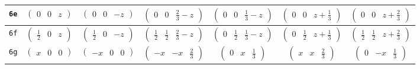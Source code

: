 \documentclass[fleqn,9pt,landscape]{jsarticle}
\begin{document}
\begin{center}
\begin{longtable}{ccccccc}
{\tt 6e} & $ \begin{pmatrix} 0 & 0 & z \end{pmatrix} $ & $ \begin{pmatrix} 0 & 0 & - z \end{pmatrix} $ & $ \begin{pmatrix} 0 & 0 & \frac{2}{3} - z \end{pmatrix} $ & $ \begin{pmatrix} 0 & 0 & \frac{1}{3} - z \end{pmatrix} $ & $ \begin{pmatrix} 0 & 0 & z + \frac{1}{3} \end{pmatrix} $ & $ \begin{pmatrix} 0 & 0 & z + \frac{2}{3} \end{pmatrix} $ \\ \hline
{\tt 6f} & $ \begin{pmatrix} \frac{1}{2} & 0 & z \end{pmatrix} $ & $ \begin{pmatrix} \frac{1}{2} & 0 & - z \end{pmatrix} $ & $ \begin{pmatrix} \frac{1}{2} & \frac{1}{2} & \frac{2}{3} - z \end{pmatrix} $ & $ \begin{pmatrix} 0 & \frac{1}{2} & \frac{1}{3} - z \end{pmatrix} $ & $ \begin{pmatrix} 0 & \frac{1}{2} & z + \frac{1}{3} \end{pmatrix} $ & $ \begin{pmatrix} \frac{1}{2} & \frac{1}{2} & z + \frac{2}{3} \end{pmatrix} $ \\ \hline
{\tt 6g} & $ \begin{pmatrix} x & 0 & 0 \end{pmatrix} $ & $ \begin{pmatrix} - x & 0 & 0 \end{pmatrix} $ & $ \begin{pmatrix} - x & - x & \frac{2}{3} \end{pmatrix} $ & $ \begin{pmatrix} 0 & x & \frac{1}{3} \end{pmatrix} $ & $ \begin{pmatrix} x & x & \frac{2}{3} \end{pmatrix} $ & $ \begin{pmatrix} 0 & - x & \frac{1}{3} \end{pmatrix} $ \\ \hline

\end{longtable}
\end{center}
\end{document}
